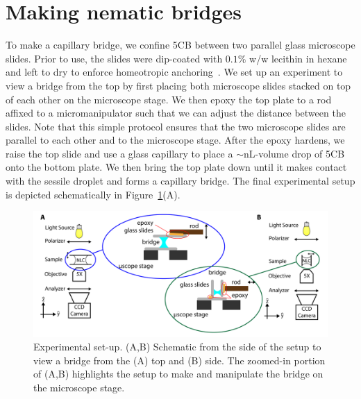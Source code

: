 \section{Making nematic bridges}
To make a capillary bridge, we confine 5CB between two parallel glass microscope slides.
Prior to use, the slides were dip-coated with $0.1\%$ w/w lecithin in hexane and left to dry to enforce homeotropic anchoring~\cite{RN140}.
We set up an experiment to view a bridge from the top by first placing both microscope slides stacked on top of each other on the microscope stage.
We then epoxy the top plate to a rod affixed to a micromanipulator such that we can adjust the distance between the slides.
Note that this simple protocol ensures that the two microscope slides are parallel to each other and to the microscope stage.
After the epoxy hardens, we raise the top slide and use a glass capillary to place a $\sim$nL-volume drop of 5CB onto the bottom plate.
We then bring the top plate down until it makes contact with the sessile droplet and forms a capillary bridge.
The final experimental setup is depicted schematically in Figure~\ref{f:5-BuildSchemaic}(A).
\begin{figure}
  \centering
  \includegraphics{figures/C5/Ch5-Figs_BuildSchematic.png}
  \caption{Experimental set-up.
  (A,B) Schematic from the side of the setup to view a bridge from the (A) top and (B) side.
  The zoomed-in portion of (A,B) highlights the setup to make and manipulate the bridge on the microscope stage.}\label{f:5-BuildSchemaic}
\end{figure}

